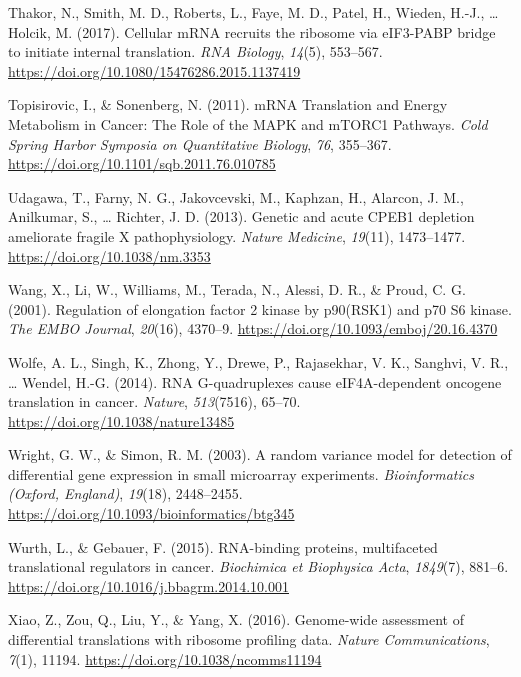 \documentclass[12pt,openany]{book}
\begin{document}
\hypertarget{ref-Thakor2017}{}
Thakor, N., Smith, M. D., Roberts, L., Faye, M. D., Patel, H., Wieden,
H.-J., \ldots{} Holcik, M. (2017). Cellular mRNA recruits the ribosome
via eIF3-PABP bridge to initiate internal translation. \emph{RNA
Biology}, \emph{14}(5), 553--567.
\url{https://doi.org/10.1080/15476286.2015.1137419}

\hypertarget{ref-Topisirovic2011}{}
Topisirovic, I., \& Sonenberg, N. (2011). mRNA Translation and Energy
Metabolism in Cancer: The Role of the MAPK and mTORC1 Pathways.
\emph{Cold Spring Harbor Symposia on Quantitative Biology}, \emph{76},
355--367. \url{https://doi.org/10.1101/sqb.2011.76.010785}

\hypertarget{ref-Udagawa2013}{}
Udagawa, T., Farny, N. G., Jakovcevski, M., Kaphzan, H., Alarcon, J. M.,
Anilkumar, S., \ldots{} Richter, J. D. (2013). Genetic and acute CPEB1
depletion ameliorate fragile X pathophysiology. \emph{Nature Medicine},
\emph{19}(11), 1473--1477. \url{https://doi.org/10.1038/nm.3353}

\hypertarget{ref-Wang2001}{}
Wang, X., Li, W., Williams, M., Terada, N., Alessi, D. R., \& Proud, C.
G. (2001). Regulation of elongation factor 2 kinase by p90(RSK1) and p70
S6 kinase. \emph{The EMBO Journal}, \emph{20}(16), 4370--9.
\url{https://doi.org/10.1093/emboj/20.16.4370}

\hypertarget{ref-Wolfe2014}{}
Wolfe, A. L., Singh, K., Zhong, Y., Drewe, P., Rajasekhar, V. K.,
Sanghvi, V. R., \ldots{} Wendel, H.-G. (2014). RNA G-quadruplexes cause
eIF4A-dependent oncogene translation in cancer. \emph{Nature},
\emph{513}(7516), 65--70. \url{https://doi.org/10.1038/nature13485}

\hypertarget{ref-Wright2003}{}
Wright, G. W., \& Simon, R. M. (2003). A random variance model for
detection of differential gene expression in small microarray
experiments. \emph{Bioinformatics (Oxford, England)}, \emph{19}(18),
2448--2455. \url{https://doi.org/10.1093/bioinformatics/btg345}

\hypertarget{ref-Wurth2015}{}
Wurth, L., \& Gebauer, F. (2015). RNA-binding proteins, multifaceted
translational regulators in cancer. \emph{Biochimica et Biophysica
Acta}, \emph{1849}(7), 881--6.
\url{https://doi.org/10.1016/j.bbagrm.2014.10.001}

\hypertarget{ref-Xiao2016}{}
Xiao, Z., Zou, Q., Liu, Y., \& Yang, X. (2016). Genome-wide assessment
of differential translations with ribosome profiling data. \emph{Nature
Communications}, \emph{7}(1), 11194.
\url{https://doi.org/10.1038/ncomms11194}
\end{document}
